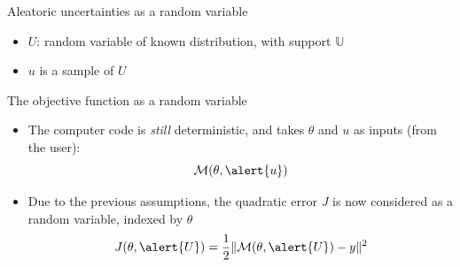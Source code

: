 \documentclass[10pt,aspectratio=169,usepdftitle=false]{beamer}
\newcommand{\Uspace}{\mathbb{U}}
\newcommand{\yobs}{y}
\newcommand{\kk}{\theta}
\newcommand{\uu}{u}
\newcommand{\UU}{U}
\begin{document}
\begin{frame}[t]{Aleatoric uncertainties as a random variable}
  \begin{itemize}
  \item $\UU$: random variable of known distribution, with support $\Uspace$
  \item    $\uu$ is a sample of $\UU$ 
  \end{itemize}
  \vfill {}%
   \vfill


\end{frame}

\begin{frame}{The objective function as a random variable}
  \begin{itemize}
  \item The computer code is \textit{still} deterministic, and takes $\kk$ and $\uu$
    as inputs (from the user):
    \begin{equation*}
      \mathcal{M}(\kk,\alert{\uu})
    \end{equation*}
  \item Due to the previous assumptions, the quadratic error $J$ is
    now considered as a random variable, indexed by $\kk$
    \begin{equation*}
      J(\kk,\alert{\UU}) =  \frac12\|\mathcal{M}(\kk,\alert{\UU}) - \yobs\|^2
    \end{equation*}
  \end{itemize}

\end{frame}
\end{document}

